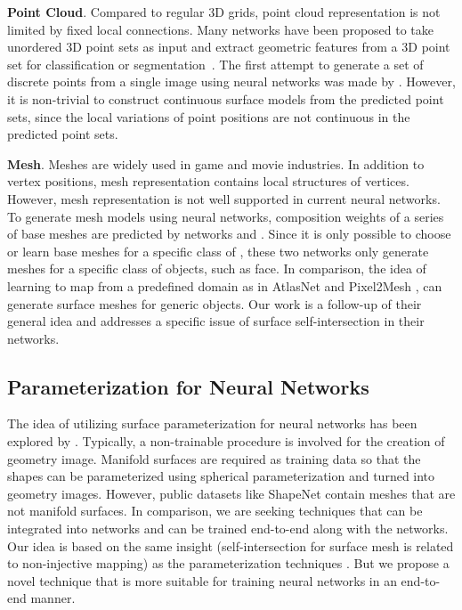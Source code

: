 \noindent\textbf{Point Cloud}. 
Compared to regular 3D grids, point cloud representation is not limited by fixed local connections.
Many networks have been proposed to take unordered 3D point sets as input and extract geometric features from a 3D point set for classification or segmentation~\cite{pointnet,NIPS2017_7095,pointcnn}.
%
The first attempt to generate a set of discrete points from a single image using neural networks was made by \cite{PSGN}. However, it is non-trivial to construct continuous surface models from the predicted point sets, since the local variations of point positions are not continuous in the predicted point sets.

\noindent\textbf{Mesh}.
Meshes are widely used in game and movie industries.
In addition to vertex positions, mesh representation contains local structures of vertices. 
However, mesh representation is not well supported in current neural networks.
% 
To generate mesh models using neural networks, composition weights of a series of base meshes are predicted by networks \cite{img2mesh} and \cite{endface}. %
Since it is only possible to choose or learn base meshes for a specific class of , these two networks only generate meshes for a specific class of objects, such as face.
%
In comparison, the idea of learning to map from a predefined domain as in AtlasNet  \cite{atlasnet} and Pixel2Mesh \cite{pixel2mesh}, can generate surface meshes for generic objects. Our work is a follow-up of their general idea and addresses a specific issue of surface self-intersection in their networks.

\subsection{Parameterization for Neural Networks}
The idea of utilizing surface parameterization for neural networks has been explored by \cite{surfnet,geoimg}. 
Typically, a non-trainable procedure is involved for the creation of geometry image. 
Manifold surfaces are required as training data so that the shapes can be parameterized using spherical parameterization and turned into geometry images. However, public datasets like ShapeNet \cite{shapenetdata} contain meshes that are not manifold surfaces. 
In comparison, we are seeking techniques that can be integrated into networks and can be trained end-to-end along with the networks. Our idea is based on the same insight (self-intersection for surface mesh is related to non-injective mapping) as the parameterization techniques . But we propose a novel technique that is more suitable for training neural networks in an end-to-end manner. 

